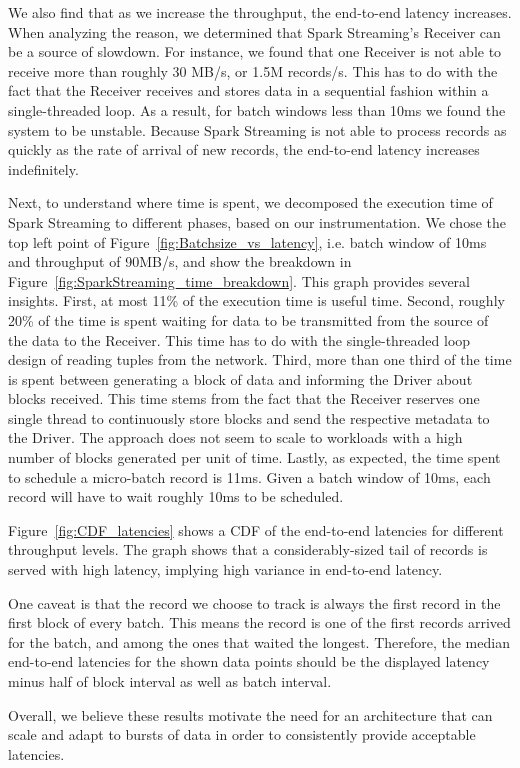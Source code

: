 We also find that as we increase the throughput, the end-to-end latency increases.
When analyzing the reason, we determined that Spark Streaming's Receiver can be a source of slowdown.
For instance, we found that one Receiver is not able to receive more than roughly 30 MB/s, or 1.5M records/s.
This has to do with the fact that the Receiver receives and stores data in a sequential fashion within a single-threaded loop.
As a result, for batch windows less than 10ms we found the system to be unstable. 
Because Spark Streaming is not able to process records as quickly as the rate of arrival of new records, the end-to-end latency increases indefinitely.

Next, to understand where time is spent, we decomposed the execution time of Spark Streaming to different phases, based on our instrumentation.
We chose the top left point of Figure~\ref{fig:Batchsize_vs_latency}, i.e. batch window of 10ms and throughput of 90MB/s, and show the breakdown in Figure~\ref{fig:SparkStreaming_time_breakdown}. 
This graph provides several insights. 
First, at most 11\% of the execution time is useful time.
Second, roughly 20\% of the time is spent waiting for data to be transmitted from the source of the data to the Receiver.
This time has to do with the single-threaded loop design of reading tuples from the network.
Third, more than one third of the time is spent between generating a block of data and informing the Driver about blocks received.
This time stems from the fact that the Receiver reserves one single thread to continuously store blocks and send the respective metadata to the Driver.
The approach does not seem to scale to workloads with a high number of blocks generated per unit of time.
Lastly, as expected, the time spent to schedule a micro-batch record is 11ms. Given a batch window of 10ms, each record will have to wait roughly 10ms to be scheduled.

Figure~\ref{fig:CDF_latencies} shows a CDF of the end-to-end latencies for different throughput levels. The graph shows that a considerably-sized tail of records is served with high latency, implying high variance in end-to-end latency.

One caveat is that the record we choose to track is always the first record in the first block of every batch. This means the record is one of the first records arrived for the batch, and among the ones that waited the longest. Therefore, the median end-to-end latencies for the shown data points should be the displayed latency minus half of block interval as well as batch interval.

Overall, we believe these results motivate the need for an architecture that can scale and adapt to bursts of data in order to consistently provide acceptable latencies.
